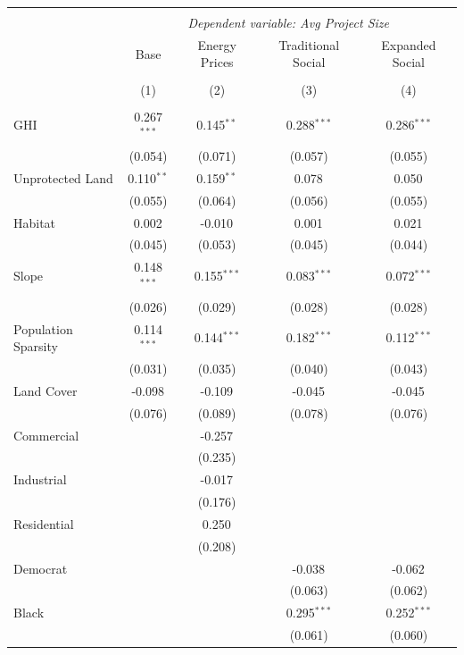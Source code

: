 \begin{table}[!htbp] \centering
\begin{tabular}{@{\extracolsep{5pt}}lcccc}
\\[-1.8ex]\hline
\hline \\[-1.8ex]
& \multicolumn{4}{c}{\textit{Dependent variable: Avg Project Size}} \
\cr \cline{2-5}
\\[-1.8ex] & \multicolumn{1}{c}{Base} & \multicolumn{1}{c}{Energy Prices} & \multicolumn{1}{c}{Traditional Social} & \multicolumn{1}{c}{Expanded Social}  \\
\\[-1.8ex] & (1) & (2) & (3) & (4) \\
\hline \\[-1.8ex]
 GHI & 0.267$^{***}$ & 0.145$^{**}$ & 0.288$^{***}$ & 0.286$^{***}$ \\
& (0.054) & (0.071) & (0.057) & (0.055) \\
 Unprotected Land & 0.110$^{**}$ & 0.159$^{**}$ & 0.078$^{}$ & 0.050$^{}$ \\
& (0.055) & (0.064) & (0.056) & (0.055) \\
 Habitat & 0.002$^{}$ & -0.010$^{}$ & 0.001$^{}$ & 0.021$^{}$ \\
& (0.045) & (0.053) & (0.045) & (0.044) \\
 Slope & 0.148$^{***}$ & 0.155$^{***}$ & 0.083$^{***}$ & 0.072$^{***}$ \\
& (0.026) & (0.029) & (0.028) & (0.028) \\
 Population Sparsity & 0.114$^{***}$ & 0.144$^{***}$ & 0.182$^{***}$ & 0.112$^{***}$ \\
& (0.031) & (0.035) & (0.040) & (0.043) \\
 Land Cover & -0.098$^{}$ & -0.109$^{}$ & -0.045$^{}$ & -0.045$^{}$ \\
& (0.076) & (0.089) & (0.078) & (0.076) \\
 Commercial & & -0.257$^{}$ & & \\
& & (0.235) & & \\
 Industrial & & -0.017$^{}$ & & \\
& & (0.176) & & \\
 Residential & & 0.250$^{}$ & & \\
& & (0.208) & & \\
 Democrat & & & -0.038$^{}$ & -0.062$^{}$ \\
& & & (0.063) & (0.062) \\
 Black & & & 0.295$^{***}$ & 0.252$^{***}$ \\
& & & (0.061) & (0.060) \\

\end{tabular}
\end{table}
